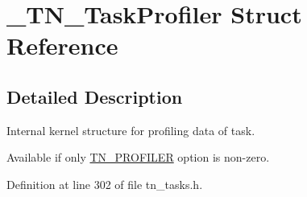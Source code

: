 \hypertarget{struct__TN__TaskProfiler}{\section{\+\_\+\+T\+N\+\_\+\+Task\+Profiler Struct Reference}
\label{struct__TN__TaskProfiler}
}


\subsection{Detailed Description}
Internal kernel structure for profiling data of task. 

Available if only {\ttfamily \hyperlink{tn__cfg__default_8h_a49a546b18cc1f75b51d4cf8b290634dd}{T\+N\+\_\+\+P\+R\+O\+F\+I\+L\+E\+R}} option is non-\/zero. 

Definition at line 302 of file tn\+\_\+tasks.\+h.

